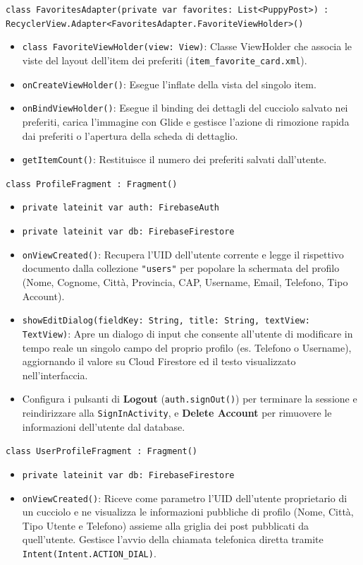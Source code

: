 \documentclass[a4paper]{report}
\begin{document}
\texttt{class FavoritesAdapter(private var favorites: List<PuppyPost>) : RecyclerView.Adapter<FavoritesAdapter.FavoriteViewHolder>()}
\begin{itemize}
    \item \texttt{class FavoriteViewHolder(view: View)}: Classe ViewHolder che associa le viste del layout dell'item dei preferiti (\texttt{item\_favorite\_card.xml}).
    \item \texttt{onCreateViewHolder()}: Esegue l'inflate della vista del singolo item.
    \item \texttt{onBindViewHolder()}: Esegue il binding dei dettagli del cucciolo salvato nei preferiti, carica l'immagine con Glide e gestisce l'azione di rimozione rapida dai preferiti o l'apertura della scheda di dettaglio.
    \item \texttt{getItemCount()}: Restituisce il numero dei preferiti salvati dall'utente.
\end{itemize}

\texttt{class ProfileFragment : Fragment()}
\begin{itemize}
    \item \texttt{private lateinit var auth: FirebaseAuth}
    \item \texttt{private lateinit var db: FirebaseFirestore}
    \item \texttt{onViewCreated()}: Recupera l'UID dell'utente corrente e legge il rispettivo documento dalla collezione \texttt{"users"} per popolare la schermata del profilo (Nome, Cognome, Città, Provincia, CAP, Username, Email, Telefono, Tipo Account).
    \item \texttt{showEditDialog(fieldKey: String, title: String, textView: TextView)}: Apre un dialogo di input che consente all'utente di modificare in tempo reale un singolo campo del proprio profilo (es. Telefono o Username), aggiornando il valore su Cloud Firestore ed il testo visualizzato nell'interfaccia.
    \item Configura i pulsanti di \textbf{Logout} (\texttt{auth.signOut()}) per terminare la sessione e reindirizzare alla \texttt{SignInActivity}, e \textbf{Delete Account} per rimuovere le informazioni dell'utente dal database.
\end{itemize}

\texttt{class UserProfileFragment : Fragment()}
\begin{itemize}
    \item \texttt{private lateinit var db: FirebaseFirestore}
    \item \texttt{onViewCreated()}: Riceve come parametro l'UID dell'utente proprietario di un cucciolo e ne visualizza le informazioni pubbliche di profilo (Nome, Città, Tipo Utente e Telefono) assieme alla griglia dei post pubblicati da quell'utente. Gestisce l'avvio della chiamata telefonica diretta tramite \texttt{Intent(Intent.ACTION\_DIAL)}.
\end{itemize}
\end{document}

